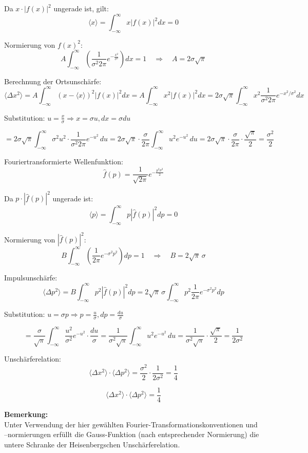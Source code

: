 \documentclass[a4paper,12pt]{article}
\begin{document}
Da \( x \cdot |f(x)|^2 \) ungerade ist, gilt:
\[
\langle x \rangle = \int_{-\infty}^{\infty} x |f(x)|^2 dx = 0
\]

Normierung von \( f(x)^2 \):
\[
A \int_{-\infty}^{\infty} \left( \frac{1}{\sigma^2 2\pi} e^{-\frac{x^2}{\sigma^2}} \right) dx = 1
\quad \Rightarrow \quad A = 2\sigma\sqrt{\pi}
\]

Berechnung der Ortsunschärfe:
\[
\langle \Delta x^2 \rangle = A \int_{-\infty}^\infty (x - \langle x \rangle)^2 |f(x)|^2 dx = A \int_{-\infty}^{\infty} x^2 |f(x)|^2 dx
= 2\sigma\sqrt{\pi} \int_{-\infty}^{\infty} x^2 \frac{1}{\sigma^2 2\pi} e^{-x^2/\sigma^2} dx
\]

Substitution: \( u = \frac{x}{\sigma} \Rightarrow x = \sigma u, dx = \sigma du \)

\[
= 2\sigma \sqrt{\pi} \int_{-\infty}^{\infty} \sigma^2 u^2 \cdot \frac{1}{\sigma^2 2\pi} e^{-u^2} \, du
= 2\sigma \sqrt{\pi} \cdot \frac{\sigma}{2\pi} \int_{-\infty}^{\infty} u^2 e^{-u^2} \, du
= 2\sigma \sqrt{\pi} \cdot \frac{\sigma}{2\pi} \cdot \frac{\sqrt{\pi}}{2}
= \frac{\sigma^2}{2}
\]

Fouriertransformierte Wellenfunktion:
\[
\hat{f}(p) = \frac{1}{\sqrt{2\pi}} e^{-\frac{p^2 \sigma^2}{2}}
\]

Da \( p \cdot |\hat{f}(p)|^2 \) ungerade ist:
\[
\langle p \rangle = \int_{-\infty}^{\infty} p |\hat{f}(p)|^2 dp = 0
\]

Normierung von \( |\hat{f}(p)|^2 \):
\[
B \int_{-\infty}^{\infty} \left( \frac{1}{2\pi} e^{-\sigma^2 p^2} \right) dp = 1
\quad \Rightarrow \quad B = 2\sqrt{\pi} \,\sigma
\]

Impulsunschärfe:
\[
\langle \Delta p^2 \rangle = B \int_{-\infty}^{\infty} p^2 |\hat{f}(p)|^2 dp
= 2\sqrt{\pi} \,\sigma \int_{-\infty}^{\infty} p^2 \frac{1}{2\pi} e^{-\sigma^2 p^2} dp
\]

Substitution: \( u = \sigma p \Rightarrow p = \frac{u}{\sigma}, dp = \frac{du}{\sigma} \)

\[
= \frac{\sigma}{\sqrt{\pi}} \int_{-\infty}^{\infty} \frac{u^2}{\sigma^2} e^{-u^2} \cdot \frac{du}{\sigma}
= \frac{1}{\sigma^2 \sqrt{\pi}} \int_{-\infty}^{\infty} u^2 e^{-u^2} \, du
= \frac{1}{\sigma^2 \sqrt{\pi}} \cdot \frac{\sqrt{\pi}}{2}
= \frac{1}{2\sigma^2}
\]

Unschärferelation:
\[
\langle \Delta x^2 \rangle \cdot \langle \Delta p^2 \rangle = \frac{\sigma^2}{2} \cdot \frac{1}{2\sigma^2} = \frac{1}{4}
\]

\[
\boxed{\langle \Delta x^2 \rangle \cdot \langle \Delta p^2 \rangle = \frac{1}{4}}
\]

\medskip

\textbf{Bemerkung:}\\
Unter Verwendung der hier gewählten Fourier-Transformationskonventionen und –normierungen erfüllt die Gauss-Funktion (nach entsprechender Normierung) die untere Schranke der Heisenbergschen Unschärferelation.
\end{document}
